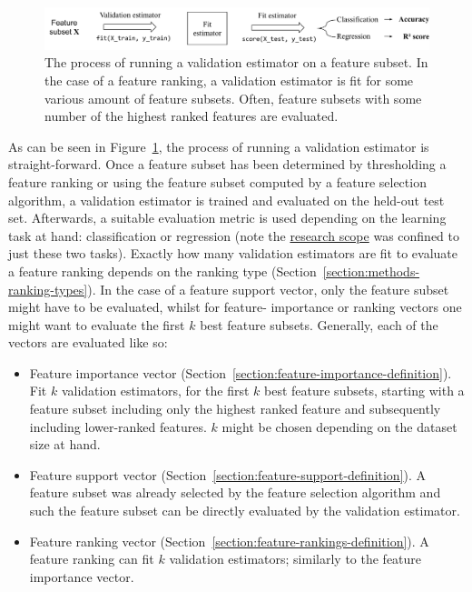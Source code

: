 \documentclass[../main.tex]{subfiles}
\begin{document}
\begin{figure}[ht]
    \centering
    \includegraphics[width=\linewidth]{report/images/schematic-validation-estimators.pdf}
    \caption{The process of running a validation estimator on a feature subset. In the case of a feature ranking, a validation estimator is fit for some various amount of feature subsets. Often, feature subsets with some number of the highest ranked features are evaluated.}
    \label{fig:schematic-validation-estimators}
\end{figure}

As can be seen in Figure~\ref{fig:schematic-validation-estimators}, the process of running a validation estimator is straight-forward. Once a feature subset has been determined by thresholding a feature ranking or using the feature subset computed by a feature selection algorithm, a validation estimator is trained and evaluated on the held-out test set. Afterwards, a suitable evaluation metric is used depending on the learning task at hand: classification or regression (note the \hyperref[section:introduction]{research scope} was confined to just these two tasks). Exactly how many validation estimators are fit to evaluate a feature ranking depends on the ranking type (Section~\ref{section:methods-ranking-types}). In the case of a feature support vector, only the feature subset might have to be evaluated, whilst for feature- importance or ranking vectors one might want to evaluate the first $k$ best feature subsets. Generally, each of the vectors are evaluated like so:

\begin{itemize}
    \item Feature importance vector (Section~\ref{section:feature-importance-definition}). Fit $k$ validation estimators, for the first $k$ best feature subsets, starting with a feature subset including only the highest ranked feature and subsequently including lower-ranked features. $k$ might be chosen depending on the dataset size at hand.
    \item Feature support vector (Section~\ref{section:feature-support-definition}). A feature subset was already selected by the feature selection algorithm and such the feature subset can be directly evaluated by the validation estimator.
    \item Feature ranking vector (Section~\ref{section:feature-rankings-definition}). A feature ranking can fit $k$ validation estimators; similarly to the feature importance vector.
\end{itemize}
\end{document}
